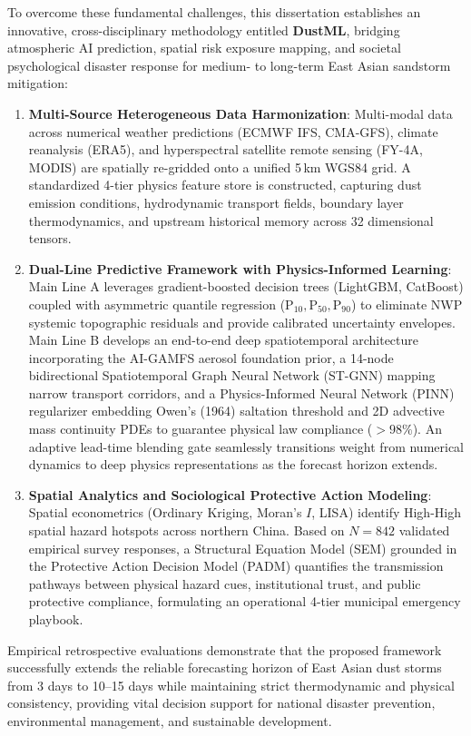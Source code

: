 \documentclass[12pt,a4paper,openany,twoside]{book}
\begin{document}
To overcome these fundamental challenges, this dissertation establishes an innovative, cross-disciplinary methodology entitled \textbf{DustML}, bridging atmospheric AI prediction, spatial risk exposure mapping, and societal psychological disaster response for medium- to long-term East Asian sandstorm mitigation:
\begin{enumerate}
    \item \textbf{Multi-Source Heterogeneous Data Harmonization}: Multi-modal data across numerical weather predictions (ECMWF IFS, CMA-GFS), climate reanalysis (ERA5), and hyperspectral satellite remote sensing (FY-4A, MODIS) are spatially re-gridded onto a unified 5\,km WGS84 grid. A standardized 4-tier physics feature store is constructed, capturing dust emission conditions, hydrodynamic transport fields, boundary layer thermodynamics, and upstream historical memory across 32 dimensional tensors.
    \item \textbf{Dual-Line Predictive Framework with Physics-Informed Learning}: Main Line A leverages gradient-boosted decision trees (LightGBM, CatBoost) coupled with asymmetric quantile regression ($\text{P}_{10}, \text{P}_{50}, \text{P}_{90}$) to eliminate NWP systemic topographic residuals and provide calibrated uncertainty envelopes. Main Line B develops an end-to-end deep spatiotemporal architecture incorporating the AI-GAMFS aerosol foundation prior, a 14-node bidirectional Spatiotemporal Graph Neural Network (ST-GNN) mapping narrow transport corridors, and a Physics-Informed Neural Network (PINN) regularizer embedding Owen's (1964) saltation threshold and 2D advective mass continuity PDEs to guarantee physical law compliance ($>98\%$). An adaptive lead-time blending gate seamlessly transitions weight from numerical dynamics to deep physics representations as the forecast horizon extends.
    \item \textbf{Spatial Analytics and Sociological Protective Action Modeling}: Spatial econometrics (Ordinary Kriging, Moran's $I$, LISA) identify High-High spatial hazard hotspots across northern China. Based on $N=842$ validated empirical survey responses, a Structural Equation Model (SEM) grounded in the Protective Action Decision Model (PADM) quantifies the transmission pathways between physical hazard cues, institutional trust, and public protective compliance, formulating an operational 4-tier municipal emergency playbook.
\end{enumerate}

Empirical retrospective evaluations demonstrate that the proposed framework successfully extends the reliable forecasting horizon of East Asian dust storms from 3 days to 10--15 days while maintaining strict thermodynamic and physical consistency, providing vital decision support for national disaster prevention, environmental management, and sustainable development.
\end{document}

